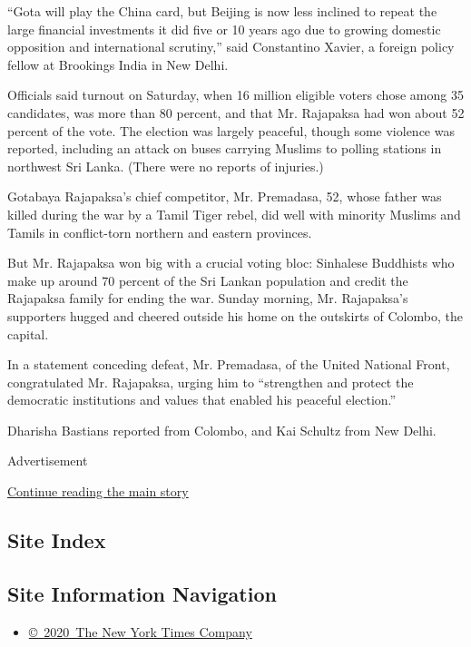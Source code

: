 ``Gota will play the China card, but Beijing is now less inclined to
repeat the large financial investments it did five or 10 years ago due
to growing domestic opposition and international scrutiny,'' said
Constantino Xavier, a foreign policy fellow at Brookings India in New
Delhi.

Officials said turnout on Saturday, when 16 million eligible voters
chose among 35 candidates, was more than 80 percent, and that Mr.
Rajapaksa had won about 52 percent of the vote. The election was largely
peaceful, though some violence was reported, including an attack on
buses carrying Muslims to polling stations in northwest Sri Lanka.
(There were no reports of injuries.)

Gotabaya Rajapaksa's chief competitor, Mr. Premadasa, 52, whose father
was killed during the war by a Tamil Tiger rebel, did well with minority
Muslims and Tamils in conflict-torn northern and eastern provinces.

But Mr. Rajapaksa won big with a crucial voting bloc: Sinhalese
Buddhists who make up around 70 percent of the Sri Lankan population and
credit the Rajapaksa family for ending the war. Sunday morning, Mr.
Rajapaksa's supporters hugged and cheered outside his home on the
outskirts of Colombo, the capital.

In a statement conceding defeat, Mr. Premadasa, of the United National
Front, congratulated Mr. Rajapaksa, urging him to ``strengthen and
protect the democratic institutions and values that enabled his peaceful
election.''

Dharisha Bastians reported from Colombo, and Kai Schultz from New Delhi.

Advertisement

\protect\hyperlink{after-bottom}{Continue reading the main story}

\hypertarget{site-index}{%
\subsection{Site Index}\label{site-index}}

\hypertarget{site-information-navigation}{%
\subsection{Site Information
Navigation}\label{site-information-navigation}}

\begin{itemize}
\tightlist
\item
  \href{https://help.nytimes3xbfgragh.onion/hc/en-us/articles/115014792127-Copyright-notice}{©~2020~The
  New York Times Company}
\end{itemize}

